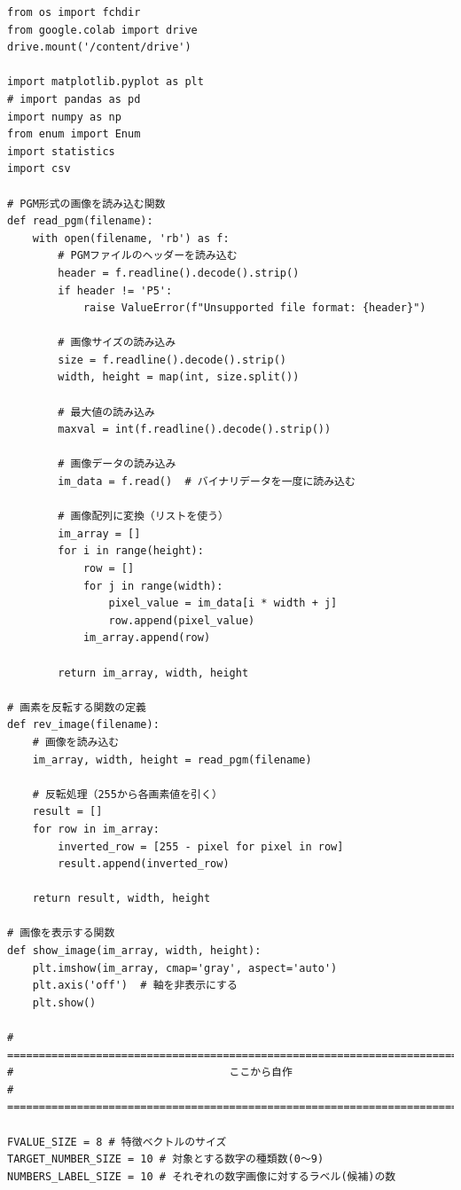 \documentclass{jlreq}
\numberwithin{equation}{section}
\begin{document}
\begin{lstlisting}[caption={特徴抽出の実装}, label=src:extract]
from os import fchdir
from google.colab import drive
drive.mount('/content/drive')

import matplotlib.pyplot as plt
# import pandas as pd
import numpy as np
from enum import Enum
import statistics
import csv

# PGM形式の画像を読み込む関数
def read_pgm(filename):
    with open(filename, 'rb') as f:
        # PGMファイルのヘッダーを読み込む
        header = f.readline().decode().strip()
        if header != 'P5':
            raise ValueError(f"Unsupported file format: {header}")

        # 画像サイズの読み込み
        size = f.readline().decode().strip()
        width, height = map(int, size.split())

        # 最大値の読み込み
        maxval = int(f.readline().decode().strip())

        # 画像データの読み込み
        im_data = f.read()  # バイナリデータを一度に読み込む

        # 画像配列に変換（リストを使う）
        im_array = []
        for i in range(height):
            row = []
            for j in range(width):
                pixel_value = im_data[i * width + j]
                row.append(pixel_value)
            im_array.append(row)

        return im_array, width, height

# 画素を反転する関数の定義
def rev_image(filename):
    # 画像を読み込む
    im_array, width, height = read_pgm(filename)

    # 反転処理（255から各画素値を引く）
    result = []
    for row in im_array:
        inverted_row = [255 - pixel for pixel in row]
        result.append(inverted_row)

    return result, width, height

# 画像を表示する関数
def show_image(im_array, width, height):
    plt.imshow(im_array, cmap='gray', aspect='auto')
    plt.axis('off')  # 軸を非表示にする
    plt.show()

# ==============================================================================
#                                  ここから自作
# ==============================================================================

FVALUE_SIZE = 8 # 特徴ベクトルのサイズ
TARGET_NUMBER_SIZE = 10 # 対象とする数字の種類数(0～9)
NUMBERS_LABEL_SIZE = 10 # それぞれの数字画像に対するラベル(候補)の数


\end{lstlisting}
\end{document}
